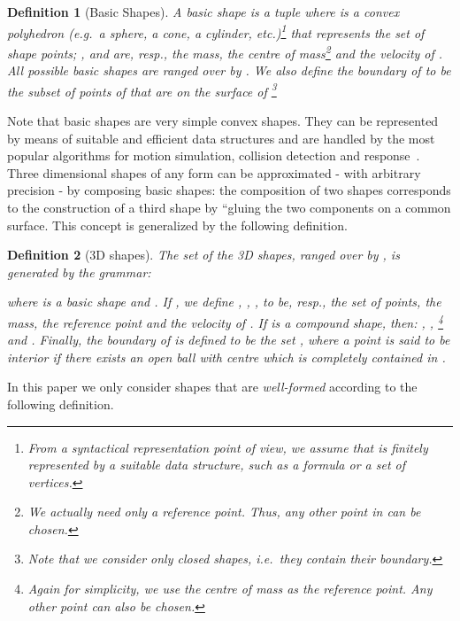 \documentclass[11pt]{article}
\newtheorem{definition}{Definition}
\begin{document}
\begin{definition}[Basic Shapes]
\label{def:bshapes}
A basic shape  is a tuple  where  is a {\em convex polyhedron} (e.g.\ a \emph{sphere}, a \emph{cone}, a \emph{cylinder}, etc.)\footnote{From a syntactical representation point of view, we assume that  is finitely represented by a suitable data structure, such as a formula or a set of vertices.} that represents the set of shape points; ,  and  are, resp., the mass, the centre of mass\footnote{We actually need only a reference point. Thus, any other point in  can be chosen.} and the velocity of . All possible basic shapes are ranged over by . We also define the {\em boundary}  of  to be the subset of points of  that are on the surface of \footnote{Note that we consider only closed shapes, i.e.\ they contain their boundary.}
\end{definition}

Note that basic shapes are very simple convex shapes. They can be represented by means of suitable and efficient data structures and are handled by the most popular algorithms for motion simulation, collision detection and response~\cite{Ericson2005}. Three dimensional shapes of any form can be approximated - with arbitrary precision - by composing basic shapes: the composition of two shapes corresponds to the construction of a third shape by ``gluing the two components on a common surface. This concept is generalized by the following definition.

\begin{definition}[3D shapes]
\label{def:shapes}
The set  of the  {\em 3D shapes}, ranged over by , is generated by the grammar:

where  is a basic shape and . If , we define , , ,   to be, resp., the {\em set of points}, the {\em mass}, the {\em reference point} and the {\em velocity} of . If   is a compound shape, then: , , \footnote{Again for simplicity, we use the centre of mass as the reference point. Any other point can also be chosen.} and . Finally, the boundary of  is defined to be the set , where a point  is said to be \emph{interior} if there exists an open ball with centre  which is completely contained in .
\end{definition}

In this paper we only consider shapes that are \emph{well-formed} according to the following
definition.
\end{document}
